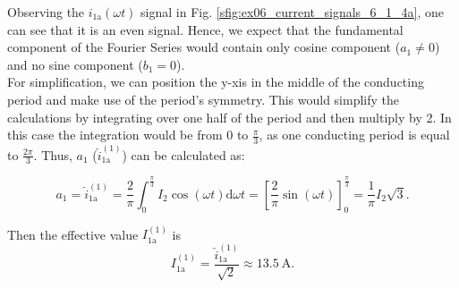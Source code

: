     \begin{solutionblock}
        
    \end{solutionblock}
    \begin{solutionblock}
        Observing the $i_\mathrm{1a}(\omega t)$ signal in Fig. \ref{sfig:ex06_current_signals_6_1_4a}, one can see that it is an even signal. Hence, we expect that the fundamental component of the Fourier Series
        would contain only cosine component ($a_1 \neq 0$) and no sine component ($b_1 = 0$). 
        \\
        For simplification, we can position the y-xis in the middle of the conducting period and make use of the period's symmetry. This would simplify the calculations
        by integrating over one half of the period and then multiply by 2. In this case the integration would be from 0 to $\frac{\pi}{3}$, as one conducting
        period is equal to $\frac{2\pi}{3}$. Thus, $a_1$ ($\hat{i}^\mathrm{(1)}_\mathrm{1a}$) can be calculated as:

        \begin{equation}
            a_1 = \hat{i}^\mathrm{(1)}_\mathrm{1a} = \frac{2}{\pi}\int_{0}^{\frac{\pi}{3}}I_\mathrm{2}\cos(\omega t) \mathrm{d}\omega t = \left[\frac{2}{\pi} \sin(\omega t)\right]^{\frac{\pi}{3}}_{0} = \frac{1}{\pi}I_\mathrm{2}\sqrt{3}.
            \label{sub6.1.4:eq:calculate_a1}
        \end{equation}  
        
        Then the effective value $I^\mathrm{(1)}_\mathrm{1a}$ is
            \begin{equation}
                I^\mathrm{(1)}_\mathrm{1a} = \frac{\hat{i}^\mathrm{(1)}_\mathrm{1a}}{\sqrt{2}} \approx \SI{13.5}{\ampere}.
                \label{sub6.1.4:eq:calculate_I_rms}
            \end{equation}   
        

\end{solutionblock}
